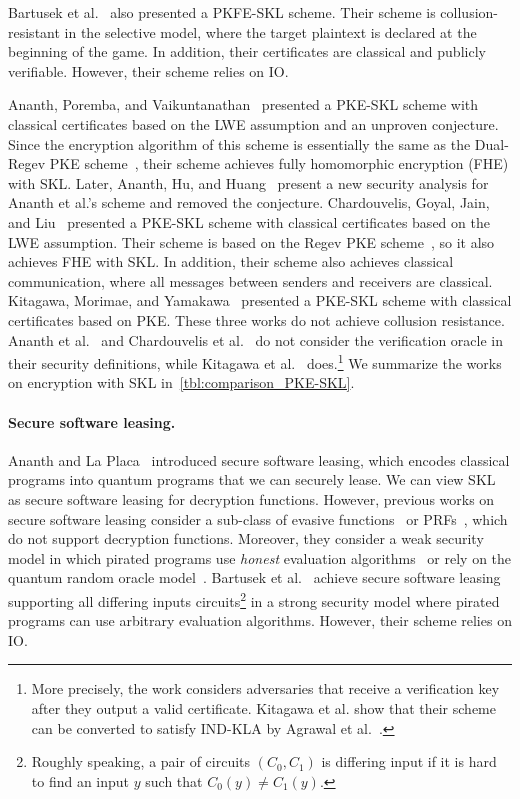 Bartusek et al.~\cite{EC:BGKMRR24} also presented a PKFE-SKL scheme.
Their scheme is collusion-resistant in the selective model, where the target plaintext is declared at the beginning of the game. In addition, their certificates are classical and publicly verifiable. However, their scheme relies on IO.

Ananth, Poremba, and Vaikuntanathan~\cite{TCC:AnaPorVai23} presented a PKE-SKL scheme with classical certificates based on the LWE assumption and an unproven conjecture.
Since the encryption algorithm of this scheme is essentially the same as the Dual-Regev PKE scheme~\cite{STOC:GenPeiVai08}, their scheme achieves fully homomorphic encryption (FHE) with SKL. Later, Ananth, Hu, and Huang~\cite{TCC:AnaHuHua24} present a new security analysis for Ananth et al.'s scheme and removed the conjecture.
Chardouvelis, Goyal, Jain, and Liu~\cite{EPRINT:CGJL23} presented a PKE-SKL scheme with classical certificates based on the LWE assumption. Their scheme is based on the Regev PKE scheme~\cite{JACM:Regev09}, so it also achieves FHE with SKL. In addition, their scheme also achieves classical communication, where all messages between senders and receivers are classical.
Kitagawa, Morimae, and Yamakawa~\cite{myEPRINT:KitMorYam24} presented
a PKE-SKL scheme with classical certificates based on PKE.
These three works do not achieve collusion resistance.
Ananth et al.~\cite{TCC:AnaPorVai23,TCC:AnaHuHua24} and Chardouvelis et al.~\cite{EPRINT:CGJL23} do not consider the verification oracle in their security definitions, while Kitagawa et al.~\cite{myEPRINT:KitMorYam24} does.\footnote{More precisely, the work considers adversaries that receive a verification key after they output a valid certificate. Kitagawa et al. show that their scheme can be converted to satisfy IND-KLA by Agrawal et al.~\cite{EC:AKNYY23}.}
We summarize the works on encryption with SKL in~\cref{tbl:comparison_PKE-SKL}.

\paragraph{Secure software leasing.}
Ananth and La Placa~\cite{EC:AnaLaP21} introduced secure software
leasing, which encodes classical programs into quantum programs that
we can securely lease. We can view SKL as secure software leasing for
decryption functions. However, previous works on secure software
leasing consider a sub-class of evasive
functions~\cite{EC:AnaLaP21,ARXIV:ColMajPor20,TCC:KitNisYam21,TCC:BJLPS21}
or PRFs~\cite{TCC:KitNisYam21}, which do not support decryption
functions. Moreover, they consider a weak security model in which
pirated programs use \emph{honest} evaluation
algorithms~\cite{EC:AnaLaP21,TCC:KitNis23,TCC:BJLPS21} or rely on the
quantum random oracle model~\cite{ARXIV:ColMajPor20}. Bartusek et
al.~\cite{EC:BGKMRR24} achieve secure software leasing supporting all
differing inputs circuits\footnote{Roughly speaking, a pair of
circuits $(C_0,C_1)$ is differing input if it is hard to find an input
$y$ such that $C_0(y)\ne C_1(y)$.} in a strong security model where
pirated programs can use arbitrary evaluation algorithms. However, their scheme relies on IO.



